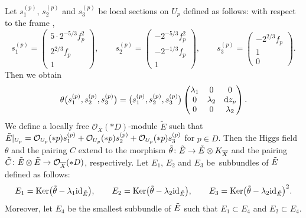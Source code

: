 \documentclass[10pt,a4paper]{amsart}
\numberwithin{equation}{section}
\newcommand{\id}{\mathrm{id}}
\newcommand{\Ker}{\operatorname{Ker}}
\newcommand{\strsheaf}{\mathcal{O}}
\begin{document}
Let $s^{(p)}_1$, $s^{(p)}_2$ and $s^{(p)}_3$ be local sections on $U_p$ defined as follows: with respect to the frame ,
\begin{equation}\label{sections}
 s^{(p)}_1 = \begin{pmatrix}
 5\cdot 2^{-5/3}f_p^2 \\
 2^{2/3} f_p \\
 1
 \end{pmatrix},\qquad
 s^{(p)}_2 = \begin{pmatrix}
 -2^{-5/3}f_p^2 \\
 -2^{-1/3} f_p \\
 1
 \end{pmatrix},\qquad
 s^{(p)}_3 = \begin{pmatrix}
 -2^{2/3}f_p \\
 1 \\
 0
 \end{pmatrix}.
\end{equation}
Then we obtain
\begin{equation*}
 \theta\bigl(s_1^{(p)},s_2^{(p)},s_3^{(p)}\bigr) = \bigl(s_1^{(p)},s_2^{(p)},s_3^{(p)}\bigr)\begin{pmatrix}
 \lambda_1 & 0 & 0\\
 0 & \lambda_2 & {\rm d}z_p \\
 0 & 0 & \lambda_2
 \end{pmatrix}.
\end{equation*}
We define a locally free $\strsheaf_{\overline{X}}(*D)$-module $\tilde{E}$ such that $\tilde{E}|_{U_p} = \mathcal{O}_{U_p}(*p)s^{(p)}_1+\mathcal{O}_{U_p}(*p)s^{(p)}_2+\smash{\mathcal{O}_{U_p}(*p)s^{(p)}_3}$ for $p\in D$. Then the Higgs field $\theta$ and the pairing $C$ extend to the morphism $\Tilde{\theta}\colon \Tilde{E}\to\Tilde{E}\otimes K_{\overline{X}}$ and the pairing $\Tilde{C}\colon \Tilde{E}\otimes \Tilde{E}\to \strsheaf_{\overline{X}}(*D)$, respectively. Let $E_1$, $E_2$ and $E_3$ be~subbundles of $\Tilde{E}$ defined as follows:
\begin{equation*}
 E_1 = \Ker\bigl(\Tilde{\theta} -\lambda_1 \id_{\Tilde{E}}\bigr), \qquad E_2 = \Ker\bigl(\Tilde{\theta} -\lambda_2 \id_{\Tilde{E}}\bigr), \qquad E_3 = \Ker\bigl(\Tilde{\theta} - \lambda_2 \id_{\Tilde{E}}\bigr)^2.
\end{equation*}
Moreover, let $E_4$ be the smallest subbundle of $\Tilde{E}$ such that $E_1\subset E_4$ and $E_2\subset E_4$.
\end{document}

